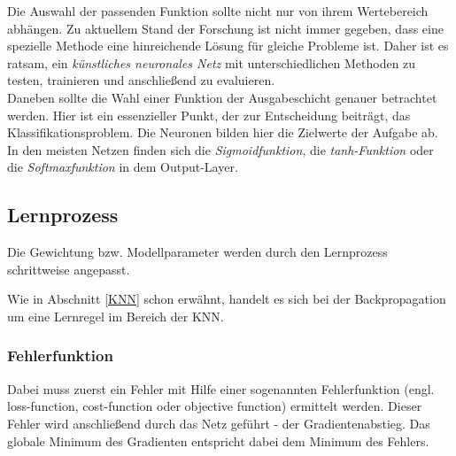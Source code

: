{Die Auswahl der passenden Funktion sollte nicht nur von ihrem Wertebereich abhängen. Zu aktuellem Stand der Forschung ist nicht immer gegeben, dass eine spezielle Methode eine hinreichende Lösung für gleiche Probleme ist. Daher ist es ratsam, ein \textit{künstliches neuronales Netz} mit unterschiedlichen Methoden zu testen, trainieren und anschließend zu evaluieren.
\\
Daneben sollte die Wahl einer Funktion der Ausgabeschicht genauer betrachtet werden. Hier ist ein essenzieller Punkt, der zur Entscheidung beiträgt, das Klassifikationsproblem. Die Neuronen bilden hier die Zielwerte der Aufgabe ab. In den meisten Netzen finden sich die \textit{Sigmoidfunktion}, die \textit{tanh-Funktion} oder die \textit{Softmaxfunktion} in dem Output-Layer.






\subsection{Lernprozess}
Die Gewichtung bzw. Modellparameter werden durch den Lernprozess schrittweise angepasst. 

Wie in Abschnitt \ref{KNN} schon erwähnt, handelt es sich bei der Backpropagation um eine Lernregel im Bereich der KNN.

\subsubsection{Fehlerfunktion} 
\label{Fehlerfunktion}
Dabei muss zuerst ein Fehler mit Hilfe einer sogenannten Fehlerfunktion (engl. loss-function, cost-function oder objective function) ermittelt werden. Dieser Fehler wird anschließend durch das Netz geführt - der Gradientenabstieg. Das globale Minimum des Gradienten entspricht dabei dem Minimum des Fehlers.\\
\cite{10}
}
